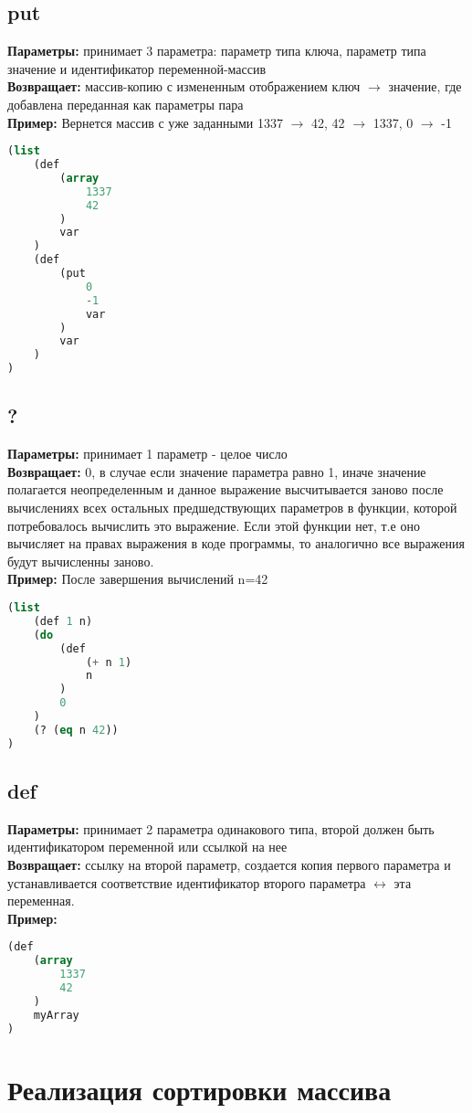 \documentclass[a4paper,12pt,oneside]{article}
\begin{document}
\subsection{put} 
\textbf{Параметры:} принимает 3 параметра: параметр типа ключа, параметр типа значение и идентификатор
    переменной-массив \\
\textbf{Возвращает:} массив-копию с измененным отображением ключ $\rightarrow$ значение, где добавлена 
    переданная как параметры пара \\
\textbf{Пример:} Вернется массив с уже заданными 1337 $\rightarrow$ 42, 42 $\rightarrow$ 1337, 0 $\rightarrow$ -1
\begin{lstlisting}[language=lisp]
(list
    (def
        (array
            1337
            42
        )
        var
    )
    (def 
        (put
            0
            -1
            var
        )
        var
    )
)
\end{lstlisting}

\subsection{?}
\textbf{Параметры:} принимает 1 параметр - целое число \\
\textbf{Возвращает:} 0, в случае если значение параметра равно 1, иначе значение полагается неопределенным и
    данное выражение высчитывается заново после вычислениях всех остальных предшедствующих параметров в функции,
    которой потребовалось вычислить это выражение. Если этой функции нет, т.е оно вычисляет на правах выражения в 
    коде программы, то аналогично все выражения будут вычисленны заново. \\
\textbf{Пример:} После завершения вычислений n=42 
\begin{lstlisting}[language=lisp]
(list
    (def 1 n)
    (do
        (def
            (+ n 1)
            n
        )
        0
    )
    (? (eq n 42))
)
\end{lstlisting}

\subsection{def} 
\textbf{Параметры:} принимает 2 параметра одинакового типа, второй должен быть идентификатором переменной 
    или ссылкой на нее \\
\textbf{Возвращает:} ссылку на второй параметр, создается копия первого параметра и устанавливается 
    соответствие идентификатор второго параметра $\leftrightarrow$ эта переменная. \\
\textbf{Пример:} 
\begin{lstlisting}[language=lisp]
(def
    (array
        1337
        42
    )
    myArray
)
\end{lstlisting}

\section{Реализация сортировки массива}

\end{document}
